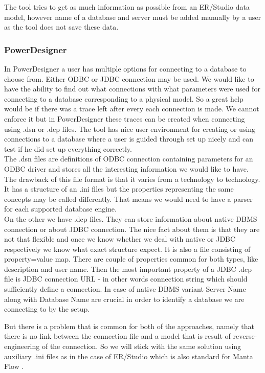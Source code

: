 The tool tries to get as much information as possible from an ER/Studio data model, however name of a database and server must be added manually by a user as the tool does not save these data.

\subsubsection{PowerDesigner}

In PowerDesigner a user has multiple options for connecting to a database to choose from. Either ODBC or JDBC connection may be used. 
We would like to have the ability to find out what connections with what parameters were used for connecting to a database corresponding to a physical model. So a great help would be if there was a trace left after every each connection is made. We cannot enforce it but in PowerDesigner these traces can be created when connecting using .dsn or .dcp files.
The tool has nice user environment for creating or using connections to a database where a user is guided through set up nicely and can test if he did set up everything correctly. \\

The .dsn files are definitions of ODBC connection containing parameters for an ODBC driver and stores all the interesting information we would like to have. The drawback of this file format is that it varies from a technology to technology. It has a structure of an .ini files but the properties representing the same concepts may be called differently. That means we would need to have a parser for each supported database engine. \\

On the other we have .dcp files. They can store information about native DBMS connection or about JDBC connection. 
The nice fact about them is that they are not that flexible and once we know whether we deal with native or JDBC respectively we know what exact structure expect. 
It is also a file consisting of property=value map.
There are couple of properties common for both types, like description and user name.
Then the most important property of a JDBC .dcp file is JDBC connection URL - in other words connection string which should sufficiently define a connection.
In case of native DBMS variant Server Name along with Database Name are crucial in order to identify a database we are connecting to by the setup.

But there is a problem that is common for both of the approaches, namely that there is no link between the connection file and a model that is result of reverse-engineering of the connection. So we will stick with the same solution using auxiliary .ini files as in the case of ER/Studio which is also standard for Manta Flow .

